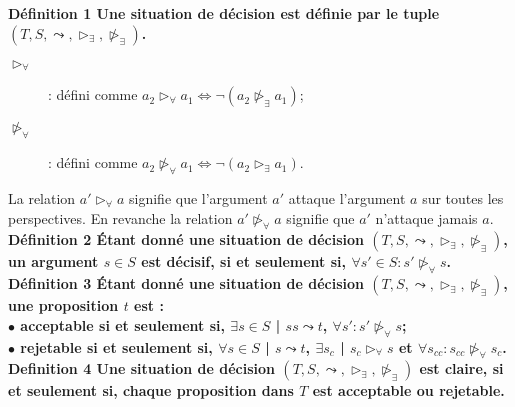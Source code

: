 \documentclass[a4paper, 11pt]{article}
\renewcommand{\textbf}[1]{\begingroup\bfseries\mathversion{bold}#1\endgroup}
\begin{document}
\noindent \textbf{Définition 1} Une situation de décision est définie par le tuple
$(T, S , \leadsto, \triangleright_\exists , \ntriangleright_\exists )$.\\

\begin{description}
\item [$\triangleright_\forall$] : défini comme 
$a_2 \triangleright_\forall a_1 \Leftrightarrow \neg(a_2 \ntriangleright_\exists
 a_1)$;
 \item [$\ntriangleright_\forall$] : défini comme 
$a_2 \ntriangleright_\forall a_1 \Leftrightarrow \neg(a_2 \triangleright_\exists
 a_1)$.\\
\end{description}

La relation $a' \triangleright_\forall a$ signifie que l'argument $a'$ attaque l'argument $a$ sur toutes les perspectives. En revanche la relation $a' \ntriangleright_\forall a$ signifie que $a'$ n'attaque jamais $a$.\\

\noindent \textbf{Définition 2} Étant donné une situation de décision $(T, S , \leadsto, \triangleright_\exists ,\ntriangleright_\exists  )$, un argument $s \in S$ est décisif, si et seulement si, $\forall s' \in S : s' \ntriangleright_\forall s$.\\

\noindent \textbf{Définition 3} Étant donné une situation de décision $(T, S , \leadsto, \triangleright_\exists , \ntriangleright_\exists )$, une proposition $t$ est :\\

\hspace*{1cm} $\bullet$ acceptable si et seulement si, $\exists s \in S$ | $ss \leadsto t$, $\forall s' : s'\ntriangleright_\forall s$;\\

\hspace*{1cm}  $\bullet$ rejetable si et seulement si, $\forall s \in S$ | $s \leadsto t$, $\exists s_c$ | $s_c \triangleright_\forall s$ et $\forall s_{cc} : s_{cc} \ntriangleright_\forall s_c$.\\


 
\noindent \textbf{Definition 4} Une situation de décision  $(T, S , \leadsto, \triangleright_\exists , \ntriangleright_\exists )$ est claire, si et seulement si, chaque proposition dans $T$ est acceptable ou rejetable.\\
\end{document}

